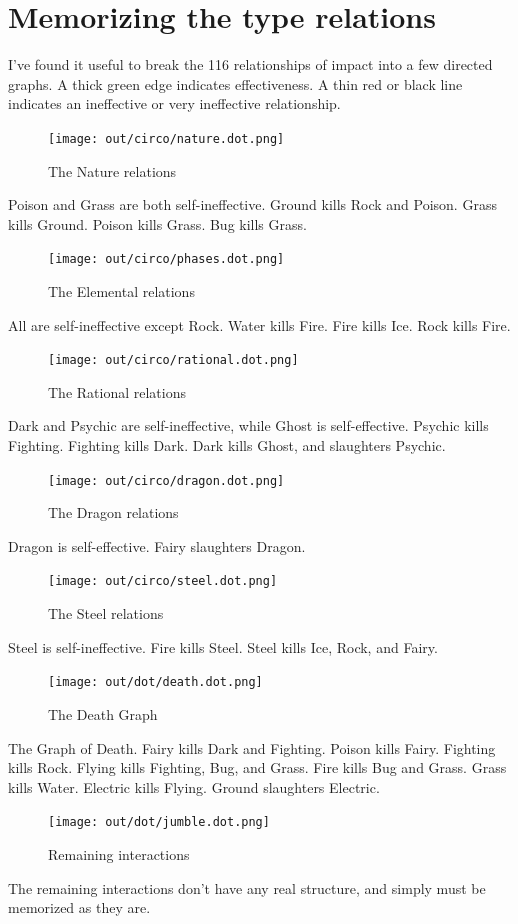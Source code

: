 \section{Memorizing the type relations}
I've found it useful to break the 116 relationships of impact into a few directed graphs.
A thick green edge indicates effectiveness.
A thin red or black line indicates an ineffective or very ineffective relationship.

\begin{figure}[h]
\centering
\texttt{[image: out/circo/nature.dot.png]}
\caption{The Nature relations}
\end{figure}
Poison and Grass are both self-ineffective.
Ground kills Rock and Poison.
Grass kills Ground.
Poison kills Grass.
Bug kills Grass.

\begin{figure}[h]
\centering
\texttt{[image: out/circo/phases.dot.png]}
\caption{The Elemental relations}
\end{figure}
All are self-ineffective except Rock.
Water kills Fire.
Fire kills Ice.
Rock kills Fire.

\begin{figure}[h]
\centering
\texttt{[image: out/circo/rational.dot.png]}
\caption{The Rational relations}
\end{figure}
Dark and Psychic are self-ineffective, while Ghost is self-effective.
Psychic kills Fighting.
Fighting kills Dark.
Dark kills Ghost, and slaughters Psychic.

\begin{figure}
\centering
\texttt{[image: out/circo/dragon.dot.png]}
\caption{The Dragon relations}
\end{figure}
Dragon is self-effective.
Fairy slaughters Dragon.

\begin{figure}
\centering
\texttt{[image: out/circo/steel.dot.png]}
\caption{The Steel relations}
\end{figure}
Steel is self-ineffective.
Fire kills Steel.
Steel kills Ice, Rock, and Fairy.

\begin{figure}[h]
\centering
\texttt{[image: out/dot/death.dot.png]}
\caption{The Death Graph}
\end{figure}
The Graph of Death.
Fairy kills Dark and Fighting.
Poison kills Fairy.
Fighting kills Rock.
Flying kills Fighting, Bug, and Grass.
Fire kills Bug and Grass.
Grass kills Water.
Electric kills Flying.
Ground slaughters Electric.

\begin{figure}[h]
\centering
\texttt{[image: out/dot/jumble.dot.png]}
\caption{Remaining interactions}
\end{figure}
The remaining interactions don't have any real structure, and simply must be
memorized as they are.
